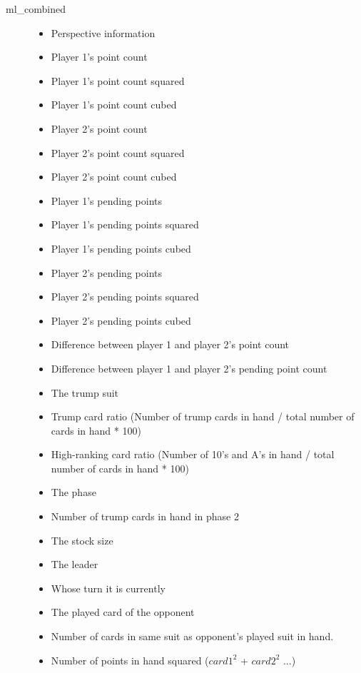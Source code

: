 \documentclass[a4paper,11pt]{article}
\begin{document}
\begin{description}
\item[ml\_combined] \hfill
\begin{itemize}
\item Perspective information
\item Player 1's point count
\item Player 1's point count squared
\item Player 1's point count cubed
\item Player 2's point count
\item Player 2's point count squared
\item Player 2's point count cubed
\item Player 1's pending points
\item Player 1's pending points squared
\item Player 1's pending points cubed
\item Player 2's pending points
\item Player 2's pending points squared
\item Player 2's pending points cubed
\item Difference between player 1 and player 2's point count
\item Difference between player 1 and player 2's pending point count
\item The trump suit
\item Trump card ratio (Number of trump cards in hand / total number of cards in hand * 100)
\item High-ranking card ratio (Number of 10's and A's in hand / total number of cards in hand * 100)
\item The phase
\item Number of trump cards in hand in phase 2
\item The stock size
\item The leader
\item Whose turn it is currently
\item The played card of the opponent
\item Number of cards in same suit as opponent's played suit in hand.
\item Number of points in hand squared ($card1^2$ + $card2^2$ ...)
\end{itemize}
\end{description}
\end{document}

